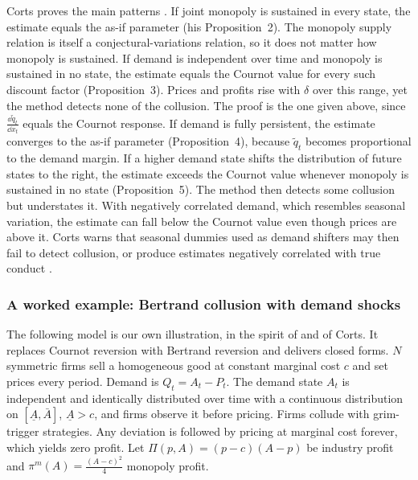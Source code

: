 Corts proves the main patterns \citep[Section~3.2]{Corts1999}. If joint monopoly is sustained in every state, the estimate
equals the as-if parameter (his Proposition~2). The monopoly supply relation is itself a conjectural-variations relation,
so it does not matter how monopoly is sustained. If demand is independent over time and monopoly is sustained in no state,
the estimate equals the Cournot value for every such discount factor (Proposition~3). Prices and profits rise with
$\delta$ over this range, yet the method detects none of the collusion. The proof is the one given above, since
$\frac{\dd\tilde q_t}{\dd x_t}$ equals the Cournot response. If demand is fully persistent, the estimate converges to the as-if
parameter (Proposition~4), because $\tilde q_t$ becomes proportional to the demand margin. If a higher demand state shifts
the distribution of future states to the right, the estimate exceeds the Cournot value whenever monopoly is sustained in no
state (Proposition~5). The method then detects some collusion but understates it. With negatively correlated demand, which
resembles seasonal variation, the estimate can fall below the Cournot value even though prices are above it. Corts warns
that seasonal dummies used as demand shifters may then fail to detect collusion, or produce estimates negatively correlated
with true conduct \citep[p.~240]{Corts1999}.

\subsubsection{A worked example: Bertrand collusion with demand shocks}\label{sec:03-corts-bertrand}

The following model is our own illustration, in the spirit of \citet{RotembergSaloner1986} and of Corts. It replaces
Cournot reversion with Bertrand reversion and delivers closed forms. $N$ symmetric firms sell a homogeneous good at constant
marginal cost $c$ and set prices every period. Demand is $Q_t = A_t - P_t$. The demand state $A_t$ is independent and
identically distributed over time with a continuous distribution on $[\underline A, \bar A]$, $\underline A > c$, and firms
observe it before pricing. Firms collude with grim-trigger strategies. Any deviation is followed by pricing at marginal cost
forever, which yields zero profit. Let $\Pi(p, A) = (p - c)(A - p)$ be industry profit and $\pi^m(A) = \frac{(A - c)^2}{4}$
monopoly profit.

